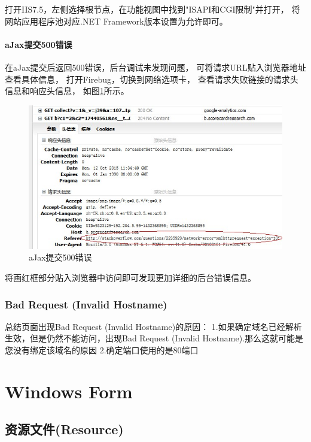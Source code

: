 \documentclass{book}
\begin{document}
打开IIS7.5，左侧选择根节点，在功能视图中找到"ISAPI和CGI限制"并打开，
将网站应用程序池对应.NET Framework版本设置为允许即可。

\subsubsection{aJax提交500错误}

在aJax提交后返回500错误，后台调试未发现问题，
可将请求URL贴入浏览器地址查看具体信息，
打开Firebug，切换到网络选项卡，
查看请求失败链接的请求头信息和响应头信息，
如图\ref{fig:CheckRequestAndResponseInfo}所示。

\begin{figure}[htbp]
	\centering
	\includegraphics[scale=0.8]{CheckRequestAndResponseInfo.jpg}
	\caption{aJax提交500错误}
	\label{fig:CheckRequestAndResponseInfo}
\end{figure}

将画红框部分贴入浏览器中访问即可发现更加详细的后台错误信息。

\subsection{Bad Request (Invalid Hostname)}

总结页面出现Bad Request (Invalid Hostname)的原因：
1.如果确定域名已经解析生效，但是仍然不能访问，出现Bad Request (Invalid Hostname).那么这就可能是您没有绑定该域名的原因
2.确定端口使用的是80端口

\chapter{Windows Form}

\section{资源文件(Resource)}
\end{document}
